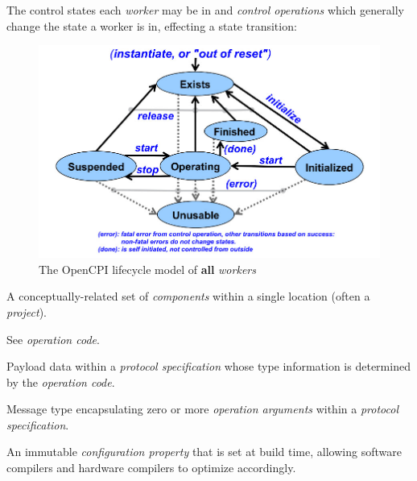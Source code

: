 \begin{description}[style=nextline]
\item[Lifecycle Model]
\begin{minipage}{\textwidth}
The control states each \textit{worker} may be in and \textit{control operations} which generally change the state a worker is in, effecting a state transition:\\
\begin{figure}[H]
\begin{center}
\includegraphics[scale=0.5]{./figures/controlops.jpg}
\caption{The OpenCPI lifecycle model of \textbf{all} \textit{workers}}
\label{fig:lifecycle}
\end{center}
\end{figure}
\end{minipage}

\item[Library]
A conceptually-related set of \textit{components} within a single location (often a \textit{project}).


\item[OpCode]
See \textit{operation code}.

\item[Operation Argument]
Payload data within a \textit{protocol specification} whose type information is determined by the \textit{operation code}.

\item[Operation Code]
Message type encapsulating zero or more \textit{operation arguments} within a \textit{protocol specification}.

\item[Parameter]
An immutable \textit{configuration property} that is set at build time, allowing software compilers and hardware compilers to optimize accordingly.


\end{description}

